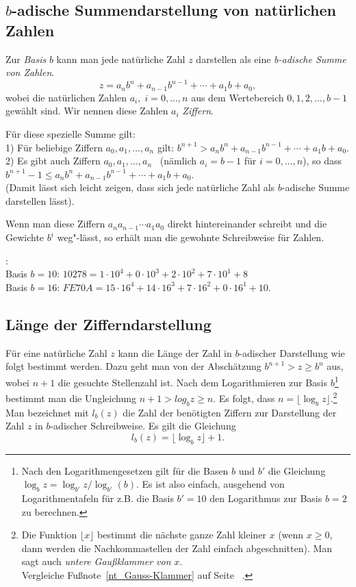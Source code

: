 \begin{refsegment}
\subsection*{$b$-adische Summendarstellung von natürlichen Zahlen}

Zur {\em Basis} $b$ kann man jede natürliche Zahl $z$ darstellen als eine
{\em b-adische Summe von Zahlen}.
$$ z = a_nb^n + a_{n-1}b^{n-1} + \cdots + a_1b + a_0, $$
wobei die natürlichen Zahlen $a_i, \; i = 0, \dots, n$ aus dem Wertebereich
$0, 1, 2, \dots, b-1$  gewählt sind.
Wir nennen diese Zahlen $a_i$ {\em Ziffern}.

Für diese spezielle Summe gilt:\\
1) Für beliebige Ziffern $a_0, a_1, \dots, a_n$ gilt:
   $b^{n+1} > a_nb^n + a_{n-1}b^{n-1} + \cdots + a_1b + a_0$.\\
2) Es gibt auch Ziffern $a_0, a_1, \dots, a_n$
   ~(nämlich $a_i = b-1$ für $i=0, \dots, n$), so dass
   $b^{n+1}-1 \le a_nb^n + a_{n-1}b^{n-1} + \cdots + a_1b + a_0$.\\
(Damit lässt sich leicht zeigen, dass sich jede natürliche Zahl als
 $b$-adische Summe darstellen lässt).

Wenn man diese Ziffern $a_na_{n-1} \cdots a_1a_0$ direkt hintereinander
schreibt und die Gewichte $b^i$ weg"-lässt, so erhält man die gewohnte
Schreibweise für Zahlen.

\begin{example}{:}\\
Basis $b = 10$: $10278 =  1\cdot10^4 +  0\cdot 10^3 + 2\cdot 10^2 + 7\cdot 10^1 + 8$\\
Basis $b = 16$: $FE70A = 15\cdot16^4 + 14\cdot 16^3 + 7\cdot 16^2 + 0\cdot 16^1 + 10$.
\end{example}


\subsection*{Länge der Zifferndarstellung}

Für eine natürliche Zahl $z$ kann die Länge der Zahl in $b$-adischer
Darstellung wie folgt bestimmt werden. Dazu geht man von der Abschätzung
$b^{n+1} > z \ge b^n$ aus, wobei $n+1$ die gesuchte Stellenzahl ist.
Nach dem Logarithmieren zur Basis $b$\footnote{%
Nach den Logarithmengesetzen gilt für die Basen $b$ und $b'$ die Gleichung
$\log_b z = \log_{b'} z / \log_{b'} (b)$.
Es ist also einfach, ausgehend von Logarithmentafeln für z.B. die Basis $b' = 10$ den Logarithmus zur Basis $b = 2$ zu berechnen.
}
bestimmt man die Ungleichung $n+1 > log_b z \ge n$.
Es folgt, dass $n = \lfloor \log_b z \rfloor$.\footnote{\label{nt_Gauss-Funktion}%
Die Funktion $\lfloor x \rfloor$ bestimmt die nächste ganze Zahl kleiner $x$
(wenn $x \ge 0$, dann werden die Nachkommastellen der Zahl einfach abgeschnitten).
Man sagt auch {\em untere Gaußklammer von} $x$.\\
Vergleiche Fußnote~\ref{nt_Gauss-Klammer} auf Seite ~\pageref{nt_Gauss-Klammer}.
}
Man bezeichnet mit $l_b(z)$ die Zahl der benötigten Ziffern zur Darstellung
der Zahl $z$ in $b$-adischer Schreibweise. Es gilt die Gleichung
$$l_b(z) = \lfloor \log_b z \rfloor +1. $$



\end{refsegment}
